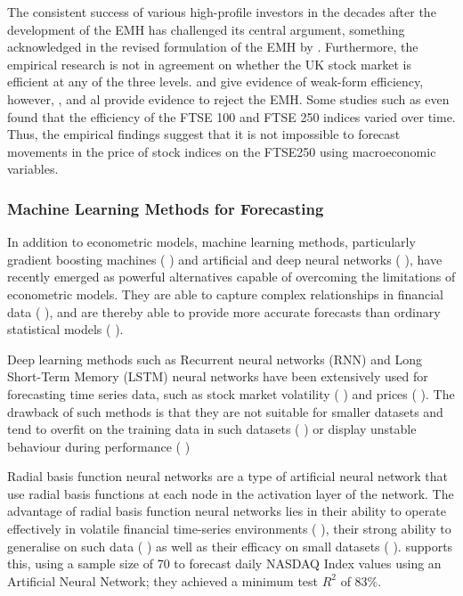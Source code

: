 \documentclass[11pt,a4paper]{article}
\newcommand{\citeboth}[1]{\citeauthor{#1} \citep{#1}}
\begin{document}
The consistent success of various high-profile investors in the decades 
after the development of the EMH has challenged 
its central argument, something acknowledged in the revised formulation of the EMH 
by \citeboth{fama1991}. Furthermore, the empirical research is not in 
agreement on whether the UK stock market is efficient at any of the three levels. 
\citeboth{libberton2010} and \citeboth{rounaghi} give evidence of weak-form efficiency,
however, \citeboth{borges2010}, \citeboth{asghar2023} and \citeboth{bhavsar2015} al provide evidence to reject the EMH. 
Some studies such as \citeboth{rosini2020} even found that the 
efficiency of the FTSE 100 and FTSE 250 indices varied over time. Thus, the empirical findings suggest 
that it is not impossible to forecast movements in the 
price of stock indices on the FTSE250 using macroeconomic variables.



\subsubsection{Machine Learning Methods for Forecasting}

In addition to econometric models, machine learning methods, 
particularly gradient boosting machines (\citeboth{gumelar,Liu2024,Chen2023}) and artificial and deep neural networks (\citeboth{chen2015lstm,kara2011ann,long2019deep,nelson2017lstm}), have recently emerged as powerful alternatives capable of overcoming the limitations of econometric models. 
They are able to capture complex relationships in financial data (\citeboth{rossi2018ml}), and 
are thereby able to provide more accurate forecasts than ordinary statistical models 
(\citeboth{lapitskaya2021armax}). 


Deep learning methods such as Recurrent neural networks (RNN) and Long Short-Term Memory (LSTM) neural networks
have been extensively used for forecasting time series data, 
such as stock market volatility (\citeboth{cho2022forecasting,praveenraj2023}) and prices (\citeboth{zhang2022lstm,song2023forecasting,dutta2024hybrid}). The drawback of such 
methods is that they are not suitable for smaller datasets and tend to overfit on the training data
in such datasets (\citeboth{foster1992}) or display unstable behaviour during performance (\citeboth{lebaron1998})

Radial basis function neural networks are a type of artificial 
neural network that use radial basis functions at each node in the 
activation layer of the network.
The advantage of radial basis function neural networks lies in their ability to 
operate effectively in volatile financial time-series 
environments (\citeboth{cafferata2019}), their strong ability to 
generalise on such data (\citeboth{sharkawy2020}) as well as their efficacy on small datasets (\citeboth{kosarac2022}). 
\citeboth{esfandyari2016}
supports this, using a sample size of 70 to forecast daily NASDAQ 
Index values using an Artificial Neural Network; they achieved a minimum
test $R^2$ of 83$\%$. 
\end{document}
